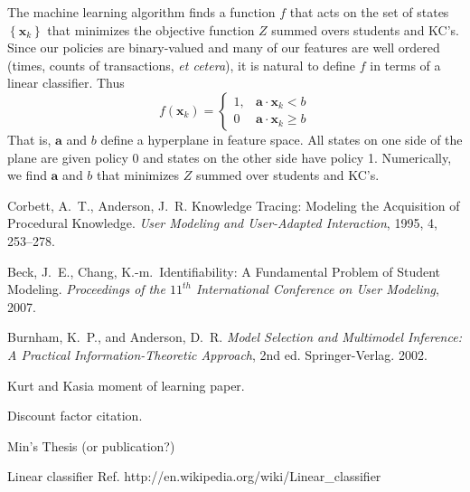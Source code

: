 \documentclass[11pt,letterpaper]{article}
\begin{document}
The machine learning algorithm finds a function $f$ that acts on
the set of states $\left\{\mathbf{x}_k\right\}$ that minimizes
the objective function $Z$ summed overs students and KC's.  
Since our policies are binary-valued
and many of our features are well ordered (times, counts of transactions,
{\em et cetera}), it is natural to define $f$ in terms of a 
linear classifier.  Thus
%
\begin{equation}
              f(\mathbf{x}_k) = \left\{\begin{array}{cc}
		1,& \mathbf{a}\cdot \mathbf{x}_k <b \\
                0 & \mathbf{a}\cdot \mathbf{x}_k \ge b
		\end{array} \right.
\end{equation}
%
That is, $\mathbf{a}$ and $b$ define a hyperplane in feature
space.  All states on one side of the plane are given policy 0
and states on the other side have policy 1.
Numerically, we find $\mathbf{a}$ and $b$ that minimizes $Z$
summed over students and KC's.



\begin{thebibliography}{9}

  Corbett, A.\ T., Anderson, J.\ R. Knowledge Tracing:  Modeling 
the Acquisition of Procedural Knowledge.  \emph{User Modeling and
 User-Adapted Interaction}, 1995, 4, 253--278.

  Beck, J.\ E., Chang, K.-m.\ Identifiability: A Fundamental Problem of
  Student Modeling.
  \emph{Proceedings of the $11^{th}$ International Conference on User 
    Modeling}, 2007.

Burnham, K.~P., and Anderson, D.~R. \emph{Model
  Selection and Multimodel Inference: A Practical
  Information-Theoretic Approach}, 2nd ed. Springer-Verlag. 2002.

Kurt and Kasia moment of learning paper.

Discount factor citation.

Min's Thesis (or publication?)

Linear classifier Ref. 
     http://en.wikipedia.org/wiki/Linear\_classifier

\end{thebibliography}
\end{document}
